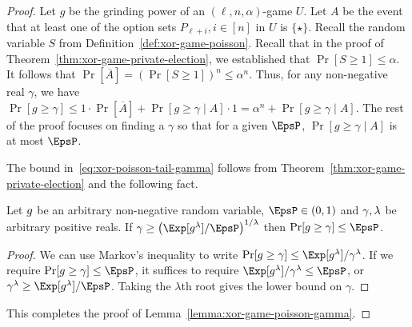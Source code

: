     \begin{proof}
        Let $g$ be the grinding power of an $(\ell, n, \alpha)$-game $U$.
        Let $A$ be the event that 
        at least one of the option sets $P_{\ell + i}, i \in [n]$ in $U$ is $\{\star\}$. 
        Recall the random variable $S$ from Definition~\ref{def:xor-game-poisson}. 
        Recall that in the proof of Theorem~\ref{thm:xor-game-private-election}, 
        we established that $\Pr[S \geq 1] \leq \alpha$. 
        It follows that $\Pr[\overline{A}] = (\Pr[S \geq 1])^n \leq \alpha^n$. 
        Thus, for any non-negative real $\gamma$, 
        we have 
        $
        \Pr[g \geq \gamma] 
        \leq 1 \cdot \Pr[\overline{A}] + \Pr[g \geq \gamma \mid A] \cdot 1
        = \alpha^n + \Pr[g \geq \gamma \mid A]
        $. 
        The rest of the proof focuses on finding a $\gamma$ so that 
        for a given $\EpsP$, 
        $\Pr[g \geq \gamma \mid A]$ is at most $\EpsP$. 

        The bound in~\eqref{eq:xor-poisson-tail-gamma} follows from 
        Theorem~\ref{thm:xor-game-private-election} and the following fact.

        \begin{fact}\label{fact:grinding-max}
            Let $g$ be an arbitrary non-negative random variable, 
            $\EpsP \in (0, 1)$ and 
            $\gamma, \lambda$ be arbitrary positive reals. 
            If $
                \GrindingMax \geq \left( \Exp[g^\lambda]/\EpsP \right)^{1/\lambda}
            $
            then $\Pr[\GrindingPower \geq \GrindingMax] \leq \EpsP$.    
        \end{fact}
        \begin{proof}
            We can use Markov's inequality to write 
            $
                \Pr[\GrindingPower \geq \GrindingMax] \leq \Exp[\GrindingPower^\lambda]/\GrindingMax^\lambda
            $.
            If we require $\Pr[\GrindingPower \geq \GrindingMax] \leq \EpsP$, 
            it suffices to require 
            $\Exp[\GrindingPower^\lambda]/\GrindingMax^\lambda \leq \EpsP$, or
            $\GrindingMax^\lambda \geq \Exp[\GrindingPower^\lambda]/\EpsP$. 
            Taking the $\lambda$th root gives the lower bound on $\gamma$.
        \end{proof}
        This completes the proof of Lemma~\ref{lemma:xor-game-poisson-gamma}.
    \end{proof}


